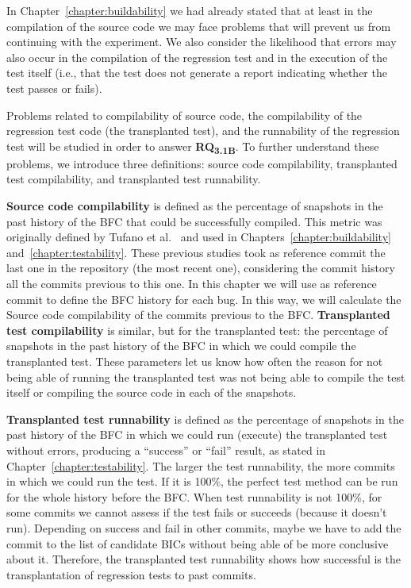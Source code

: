 In Chapter~\ref{chapter:buildability} we had already stated that at least in the compilation of the source code we may face problems that will prevent us from continuing with the experiment. 
We also consider the likelihood that errors may also occur in the compilation of the regression test and in the execution of the test itself (i.e., that the test does not generate a report indicating whether the test passes or fails).

Problems related to compilability of source code, the compilability of the regression test code (the transplanted test), and the runnability of the regression test will be studied in order to answer \textbf{RQ\textsubscript{3.1B}}. 
To further understand these problems, we introduce three definitions: source code compilability, transplanted test compilability, and transplanted test runnability.

\textbf{Source code compilability} is defined as the percentage of snapshots in the past history of the BFC that could be successfully compiled.
This metric was originally defined by Tufano et al.~\cite{tufano2017there} and used in Chapters~\ref{chapter:buildability} and~\ref{chapter:testability}.
These previous studies took as reference commit the last one in the repository (the most recent one), considering the commit history all the commits previous to this one. 
In this chapter we will use as reference commit to define the BFC history for each bug. In this way, we will calculate the Source code compilability of the commits previous to the BFC.
\textbf{Transplanted test compilability} is similar, but for the transplanted test: the percentage of snapshots in the past history of the BFC in which we could compile the transplanted test. 
These parameters let us know how often the reason for not being able of running the transplanted test was not being able to compile the test itself or compiling the source code in each of the snapshots.

\textbf{Transplanted test runnability} is defined as the percentage of snapshots in the past history of the BFC in which we could run (execute) the transplanted test without errors, producing a ``success'' or ``fail'' result, as stated in Chapter~\ref{chapter:testability}. The larger the test runnability, the more commits in which we could run the test. If it is 100\%, the perfect test method can be run for the whole history before the BFC. When test runnability is not 100\%, for some commits we cannot assess if the test fails or succeeds (because it doesn't run). Depending on success and fail in other commits, maybe we have to add the commit to the list of candidate BICs without being able of be more conclusive about it. Therefore, the transplanted test runnability shows how successful is the transplantation of regression tests to past commits.

